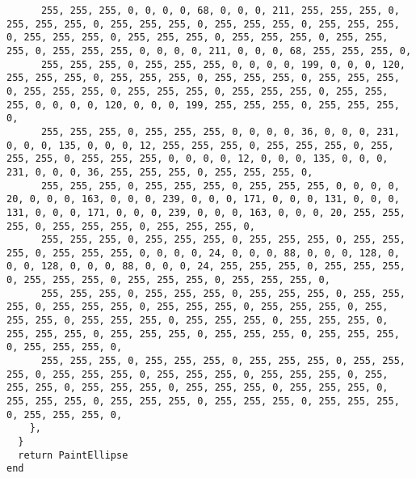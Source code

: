 \documentclass{ctexart}
\begin{document}
\begin{lstlisting}
      255, 255, 255, 0, 0, 0, 0, 68, 0, 0, 0, 211, 255, 255, 255, 0, 255, 255, 255, 0, 255, 255, 255, 0, 255, 255, 255, 0, 255, 255, 255, 0, 255, 255, 255, 0, 255, 255, 255, 0, 255, 255, 255, 0, 255, 255, 255, 0, 255, 255, 255, 0, 0, 0, 0, 211, 0, 0, 0, 68, 255, 255, 255, 0, 
      255, 255, 255, 0, 255, 255, 255, 0, 0, 0, 0, 199, 0, 0, 0, 120, 255, 255, 255, 0, 255, 255, 255, 0, 255, 255, 255, 0, 255, 255, 255, 0, 255, 255, 255, 0, 255, 255, 255, 0, 255, 255, 255, 0, 255, 255, 255, 0, 0, 0, 0, 120, 0, 0, 0, 199, 255, 255, 255, 0, 255, 255, 255, 0, 
      255, 255, 255, 0, 255, 255, 255, 0, 0, 0, 0, 36, 0, 0, 0, 231, 0, 0, 0, 135, 0, 0, 0, 12, 255, 255, 255, 0, 255, 255, 255, 0, 255, 255, 255, 0, 255, 255, 255, 0, 0, 0, 0, 12, 0, 0, 0, 135, 0, 0, 0, 231, 0, 0, 0, 36, 255, 255, 255, 0, 255, 255, 255, 0, 
      255, 255, 255, 0, 255, 255, 255, 0, 255, 255, 255, 0, 0, 0, 0, 20, 0, 0, 0, 163, 0, 0, 0, 239, 0, 0, 0, 171, 0, 0, 0, 131, 0, 0, 0, 131, 0, 0, 0, 171, 0, 0, 0, 239, 0, 0, 0, 163, 0, 0, 0, 20, 255, 255, 255, 0, 255, 255, 255, 0, 255, 255, 255, 0, 
      255, 255, 255, 0, 255, 255, 255, 0, 255, 255, 255, 0, 255, 255, 255, 0, 255, 255, 255, 0, 0, 0, 0, 24, 0, 0, 0, 88, 0, 0, 0, 128, 0, 0, 0, 128, 0, 0, 0, 88, 0, 0, 0, 24, 255, 255, 255, 0, 255, 255, 255, 0, 255, 255, 255, 0, 255, 255, 255, 0, 255, 255, 255, 0, 
      255, 255, 255, 0, 255, 255, 255, 0, 255, 255, 255, 0, 255, 255, 255, 0, 255, 255, 255, 0, 255, 255, 255, 0, 255, 255, 255, 0, 255, 255, 255, 0, 255, 255, 255, 0, 255, 255, 255, 0, 255, 255, 255, 0, 255, 255, 255, 0, 255, 255, 255, 0, 255, 255, 255, 0, 255, 255, 255, 0, 255, 255, 255, 0, 
      255, 255, 255, 0, 255, 255, 255, 0, 255, 255, 255, 0, 255, 255, 255, 0, 255, 255, 255, 0, 255, 255, 255, 0, 255, 255, 255, 0, 255, 255, 255, 0, 255, 255, 255, 0, 255, 255, 255, 0, 255, 255, 255, 0, 255, 255, 255, 0, 255, 255, 255, 0, 255, 255, 255, 0, 255, 255, 255, 0, 255, 255, 255, 0, 
    },
  }
  return PaintEllipse
end


\end{lstlisting}
\end{document}
